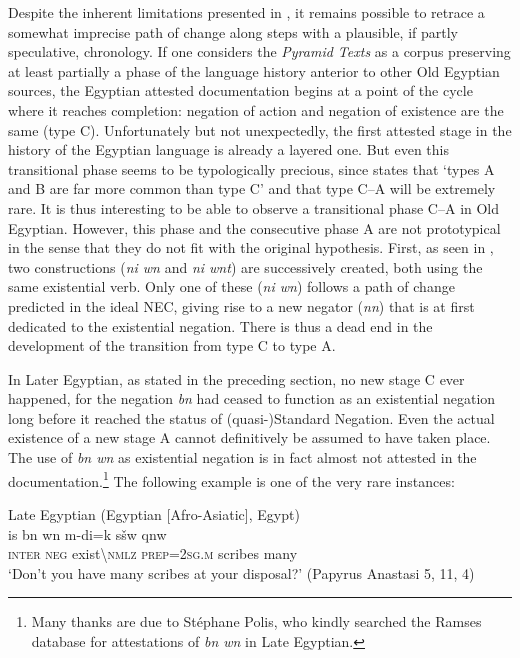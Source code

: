 \documentclass[output=paper,draft,draftmode,colorlinks,citecolor=brown]{langscibook}
\begin{document}
Despite the inherent limitations presented in , it remains possible to retrace a somewhat imprecise path of change along steps with a plausible, if partly speculative, chronology. If one considers the \emph{Pyramid Texts} as a corpus preserving at least partially a phase of the language history anterior to other Old Egyptian sources, the Egyptian attested documentation begins at a point of the cycle where it reaches completion: negation of action and negation of existence are the same (type C). Unfortunately but not unexpectedly, the first attested stage in the history of the Egyptian language is already a layered one. But even this transitional phase seems to be typologically precious, since \citet[18]{Croft1991} states that ‘types A and B are far more common than type C’ and that type C–A will be extremely rare. It is thus interesting to be able to observe a transitional phase C–A in Old Egyptian. However, this phase and the consecutive phase A are not prototypical in the sense that they do not fit with the original hypothesis. First, as seen in , two constructions (\textit{ni wn} and \textit{ni wnt}) are successively created, both using the same existential verb. Only one of these (\textit{ni wn}) follows a path of change predicted in the ideal NEC, giving rise to a new negator (\textit{nn}) that is at first dedicated to the existential negation. There is thus a dead end in the development of the transition from type C to type A.
 
In Later Egyptian, as stated in the preceding section, no new stage C ever happened, for the negation \textit{bn} had ceased to function as an existential negation long before it reached the status of (quasi-)Standard Negation. Even the actual existence of a new stage A cannot definitively be assumed to have taken place. The use of \textit{bn wn} as existential negation is in fact almost not attested in the documentation.\footnote{Many thanks are due to Stéphane Polis, who kindly searched the Ramses database for attestations of \textit{bn wn} in Late Egyptian.} 
The following example is one of the very rare instances:

\ea Late Egyptian (Egyptian [Afro-Asiatic], Egypt) \label{ex:AE51}\\
    \gll is bn wn m-di=k sšw qnw\\
    \textsc{inter} \textsc{neg} exist\textbackslash\textsc{nmlz} \textsc{prep=2sg.m} scribes many\\ 
    \glt ‘Don’t you have many scribes at your disposal?’ (Papyrus Anastasi 5, 11, 4)
\z 
\end{document}
